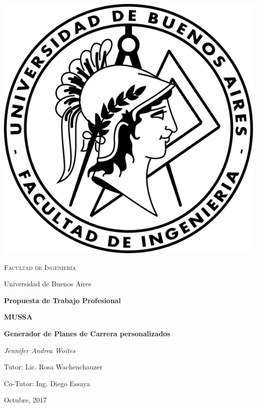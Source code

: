 \documentclass[a4paper]{article}
\begin{document}

\begin{titlepage}
	\centering
	\includegraphics{Imagenes/logo_fiuba.png}\par\vspace{1cm}
	{\scshape\LARGE Facultad de Ingeniería \par
	Universidad de Buenos Aires  \par}
	\vspace{1.5cm}
	{\Large\bfseries Propuesta de Trabajo Profesional\par}
	\vspace{1.5cm}
	{\huge\bfseries MUSSA \par}
	\vspace{0.5cm}
	{\huge\bfseries Generador de Planes de Carrera personalizados\par}
	\vspace{1cm}
	{\Large\itshape Jennifer Andrea Woites\par}
	\vfill
	{\Large
	Tutor: Lic. Rosa Wachenchauzer \par
	\vspace{0.3cm}
	Co-Tutor: Ing. Diego Essaya}
	\vfill
	{\large Octubre, 2017 \par}
\end{titlepage}
\end{document}
